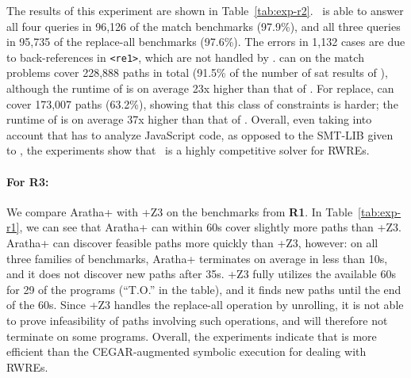 The results of this experiment are shown in
Table~\ref{tab:exp-r2}. \ostrich\ is able to answer all four queries
in 96,126 of the match benchmarks (97.9\%), and all three queries in
95,735 of the replace-all benchmarks (97.6\%). The errors in 1,132 cases
are due to back-references in \verb!<re1>!, which are not handled by
\ostrich. \expose{} can on the match problems cover 228,888 paths in
total (91.5\% of the number of sat results of \ostrich), although the
runtime of \expose{} is on average 23x higher than that of
\ostrich. For replace, \expose{} can cover 173,007 paths (63.2\%),
showing that this class of constraints is harder; the runtime of
\expose{} is on average 37x higher than that of \ostrich.  Overall,
even taking into account that \expose{} has to analyze JavaScript
code, as opposed to the SMT-LIB given to \ostrich, the experiments
show that \ostrich\ is a highly competitive solver for RWREs.


\vspace{-2mm}

\paragraph{For \textbf{R3}:} We compare Aratha+{\ostrich} with
\expose{}+Z3 on the benchmarks from \textbf{R1}. In
Table~\ref{tab:exp-r1}, we can see that Aratha+{\ostrich} can within
60s cover slightly more paths than \expose{}+Z3. Aratha+{\ostrich} can
discover feasible paths more quickly than \expose{}+Z3, however: on
all three families of benchmarks, Aratha+{\ostrich} terminates on
average in less than 10s, and it does not discover new paths 
after 35s. \expose{}+Z3 fully utilizes the available 60s for
29 of the programs (``T.O.'' in the table),
and it finds new paths until the end of the 60s. Since \expose{}+Z3
handles the replace-all operation by unrolling, it is not able to
prove infeasibility of paths involving such operations, and will
therefore not terminate on some programs.
Overall, the experiments indicate that {\ostrich} is more
efficient than the CEGAR-augmented symbolic execution for dealing
with RWREs.
